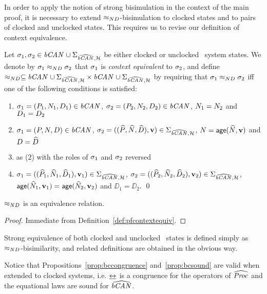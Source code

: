 In order to apply the notion of strong bisimulation in the context of
the main proof, it is necessary to extend 
$\approx_{ND}$-bisimulation to clocked states and
to pairs of clocked and unclocked states. This requires
us to revise our definition of context equivalence.
\begin{definition}\label{def:pfcontextequiv}
Let $\state_1, \state_2 \in \Sys{} \cup \States_{\CSys{},\clocks}$ be either 
clocked or unclocked \bcandle\ system states. We denote by 
$\sigma_1 \approx_{ND} \sigma_2$
that $\sigma_1$ is \emph{context equivalent} to $\sigma_2$, and
define $\ndequiv \subseteq \Sys{} \cup \States_{\CSys{},\clocks} \cross 
\Sys{} \cup \States_{\CSys{},\clocks}$ by requiring that
$\sigma_1 \approx_{ND} \sigma_2$
iff one of the following conditions is satisfied:
\begin{enumerate}
\item $\sigma_1 = ({P}_1,{N}_1,{D}_1) \in {\text{\it bCAN\/}_{}}$,
      $\sigma_2 = ({P}_2,{N}_2,{D}_2) \in {\text{\it bCAN\/}_{}}$, ${N}_1 = {N}_2$ and ${D}_1 = {D}_2$
\item $\sigma_1 = ({P},{N},{D}) \in {\text{\it bCAN\/}_{}}$, $\state_2 = ((\PP,\NN,\DD),\clkvl)
  \in \States_{\CSys{},\clocks}$, ${N} = \mathop{\sf age}({\widehat{N}},\mathbf{v})$ and ${D} = \widehat{D}$
\item as (2) with the roles of $\sigma_1$ and $\sigma_2$ reversed
\item $\state_1 = ((\PP_1,\NN_1,\DD_1),\clkvl_1) \in 
  \States_{\CSys{},\clocks}$, $\state_2 = ((\PP_2,\NN_2,\DD_2),\clkvl_2) \in 
  \States_{\CSys{},\clocks}$,
  $\mathop{\sf age}({\widehat{N}}_1,\mathbf{v}_1) = \mathop{\sf age}({\widehat{N}}_2,\mathbf{v}_2)$ and $\DD_1 = \DD_2$.
\qed
\end{enumerate} 
\end{definition}

\begin{proposition}
$\approx_{ND}$ is an equivalence relation.
\end{proposition}
\begin{proof}
Immediate from Definition~\ref{def:pfcontextequiv}.
\end{proof}

Strong equivalence of both clocked and unclocked \bcandle\ states is defined
simply as $\approx_{ND}$-bisimilarity, and related definitions are obtained in
the obvious way.
\begin{remark}
Notice that Propositions~\ref{prop:bccongruence} and~\ref{prop:bcsound}
are valid when extended to clocked systems, i.e. $\mathrel{\underline{\leftrightarrow}^{}_{}}$ is 
a congruence for the operators of $\widehat{\text{\it Proc\/}_{}}$ and the equational laws
are sound for ${\widehat{{\text{\it bCAN\/}_{}}}}$. 
\end{remark}

